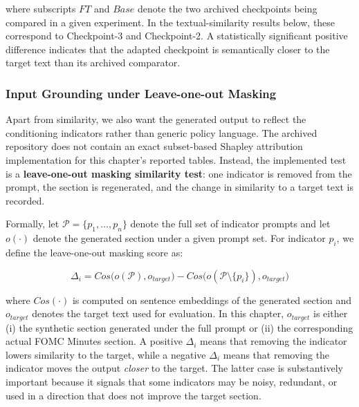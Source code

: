 where subscripts $FT$ and $Base$ denote the two archived checkpoints being compared in a given experiment. In the textual-similarity results below, these correspond to Checkpoint-3 and Checkpoint-2. A statistically significant positive difference indicates that the adapted checkpoint is semantically closer to the target text than its archived comparator.




\subsubsection*{Input Grounding under Leave-one-out Masking}

Apart from similarity, we also want the generated output to reflect the conditioning indicators rather than generic policy language. The archived repository does not contain an exact subset-based Shapley attribution implementation for this chapter's reported tables. Instead, the implemented test is a \textbf{leave-one-out masking similarity test}: one indicator is removed from the prompt, the section is regenerated, and the change in similarity to a target text is recorded.

Formally, let $\mathcal{P}=\{p_1,\ldots,p_n\}$ denote the full set of indicator prompts and let $o(\cdot)$ denote the generated section under a given prompt set. For indicator $p_i$, we define the leave-one-out masking score as:

\begin{equation}\label{eq:ch2:loo_masking}
    \Delta_i = Cos\big(o(\mathcal{P}), o_{target}\big) - Cos\big(o(\mathcal{P}\setminus\{p_i\}), o_{target}\big)
\end{equation}

where $Cos(\cdot)$ is computed on sentence embeddings of the generated section and $o_{target}$ denotes the target text used for evaluation. In this chapter, $o_{target}$ is either (i) the synthetic section generated under the full prompt or (ii) the corresponding actual FOMC Minutes section. A positive $\Delta_i$ means that removing the indicator lowers similarity to the target, while a negative $\Delta_i$ means that removing the indicator moves the output \textit{closer} to the target. The latter case is substantively important because it signals that some indicators may be noisy, redundant, or used in a direction that does not improve the target section.

